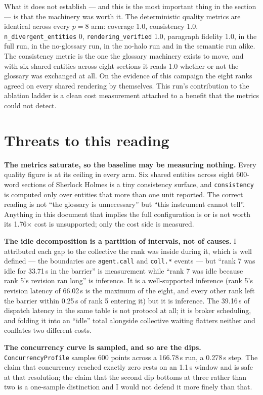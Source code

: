 \documentclass[11pt]{article}
\begin{document}
What it does not establish --- and this is the most important thing in the section --- is
that the machinery was worth it. The deterministic quality metrics are identical across
every $p=8$ arm: coverage 1.0, consistency 1.0, \texttt{n\_divergent\_entities} 0,
\texttt{rendering\_verified} 1.0, paragraph fidelity 1.0, in the full run, in the
no-glossary run, in the no-halo run and in the semantic run alike. The consistency metric
is the one the glossary machinery exists to move, and with six shared entities across eight
sections it reads 1.0 whether or not the glossary was exchanged at all. On the evidence of
this campaign the eight ranks agreed on every shared rendering by themselves. This run's
contribution to the ablation ladder is a clean cost measurement attached to a benefit that
the metrics could not detect.

\section{Threats to this reading}

\textbf{The metrics saturate, so the baseline may be measuring nothing.} Every quality
figure is at its ceiling in every arm. Six shared entities across eight 600-word sections
of Sherlock Holmes is a tiny consistency surface, and \texttt{consistency} is computed only
over entities that more than one unit reported. The correct reading is not ``the glossary is
unnecessary'' but ``this instrument cannot tell''. Anything in this document that implies
the full configuration is or is not worth its 1.76$\times$ cost is unsupported; only the cost
side is measured.

\textbf{The idle decomposition is a partition of intervals, not of causes.} I attributed
each gap to the collective the rank was inside during it, which is well defined --- the
boundaries are \texttt{agent.call} and \texttt{coll.*} events --- but ``rank 7 was idle for
33.71\,s in the barrier'' is measurement while ``rank 7 was idle because rank 5's revision
ran long'' is inference. It is a well-supported inference (rank 5's revision latency of
66.02\,s is the maximum of the eight, and every other rank left the barrier within
0.25\,s of rank 5 entering it) but it is inference. The 39.16\,s of dispatch latency in the same table is not protocol at
all; it is broker scheduling, and folding it into an ``idle'' total alongside collective
waiting flatters neither and conflates two different costs.

\textbf{The concurrency curve is sampled, and so are the dips.} \texttt{ConcurrencyProfile}
samples 600 points across a 166.78\,s run, a 0.278\,s step. The claim that concurrency
reached exactly zero rests on an 1.1\,s window and is safe at that resolution; the claim
that the second dip bottoms at three rather than two is a one-sample distinction and I would
not defend it more finely than that.
\end{document}
